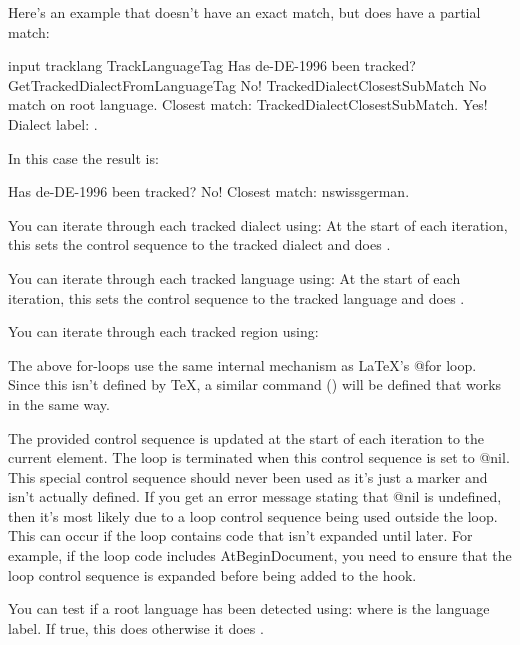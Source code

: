 \documentclass[titlepage=false,oneside,
 fontsize=12pt,captions=tableheading]{scrbook}
\begin{document}
Here's an example that doesn't have an exact match, but does have a
partial match:
\begin{codebox}
\gls{input} tracklang
\gls{TrackLanguageTag}
Has de-DE-1996 been tracked?
\gls{GetTrackedDialectFromLanguageTag}\comment{}
 No!
  \gls{TrackedDialectClosestSubMatch}
    No match on root language.
    Closest match: \gls{TrackedDialectClosestSubMatch}.
 Yes! Dialect label: .
\end{codebox}
In this case the result is:
\begin{resultbox}
Has de-DE-1996 been tracked? No! Closest match: nswissgerman.
\end{resultbox}

You can iterate through each tracked dialect using:
At the start of each iteration, this sets the control sequence 
 to the tracked dialect and does .

You can iterate through each tracked language using:
At the start of each iteration, this sets the control sequence  to the 
tracked language and does .

You can iterate through each tracked region using:

The above for-loops use the same internal mechanism as \LaTeX's
\gls{@for} loop. Since this isn't defined by \TeX, a similar command
() will be defined that works in the same way.

The provided control sequence  is updated at the
start of each iteration to the current element. The loop is
terminated when this control sequence is set to \gls{@nil}. This
special control sequence should never been used as it's just a
marker and isn't actually defined. If you get an error message
stating that \gls{@nil} is undefined, then it's most likely due to a
loop control sequence being used outside the loop. This can occur if
the loop contains code that isn't expanded until later. For example,
if the loop code includes \gls{AtBeginDocument}, you need to ensure
that the loop control sequence is expanded before being added to the
hook.

You can test if a root language has been detected using:
where  is the language label. If
true, this does  otherwise it does .
\end{document}
